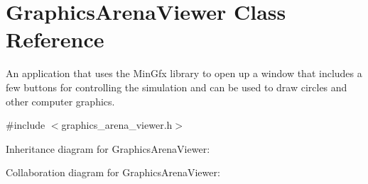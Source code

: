 \hypertarget{classGraphicsArenaViewer}{}\section{Graphics\+Arena\+Viewer Class Reference}
\label{classGraphicsArenaViewer}


An application that uses the Min\+Gfx library to open up a window that includes a few buttons for controlling the simulation and can be used to draw circles and other computer graphics.  




{\ttfamily \#include $<$graphics\+\_\+arena\+\_\+viewer.\+h$>$}



Inheritance diagram for Graphics\+Arena\+Viewer\+:


Collaboration diagram for Graphics\+Arena\+Viewer\+:
